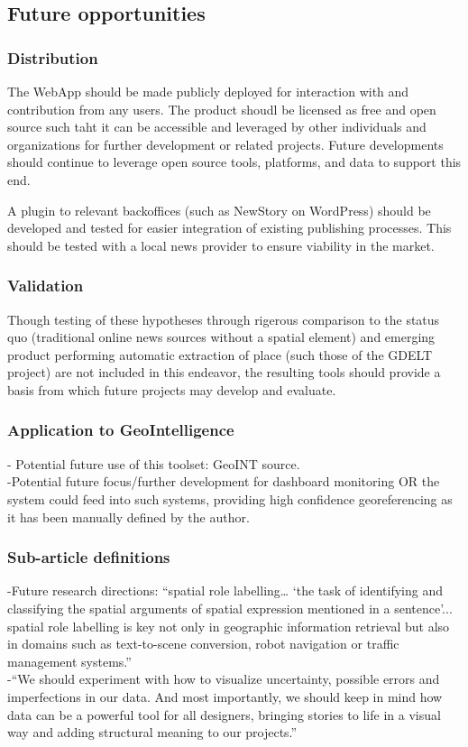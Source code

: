 \subsection{Future opportunities}
\subsubsection{Distribution}
The WebApp should be made publicly deployed for interaction with and contribution from any users. The product shoudl be licensed as free and open source such taht it can be accessible and leveraged by other individuals and organizations for further development or related projects. Future developments should continue to leverage open source tools, platforms, and data to support this end.

A plugin to relevant backoffices (such as {\color{red}NewStory} on WordPress) should be developed and tested for easier integration of existing publishing processes. This should be tested with a local news provider to ensure viability in the market.

\subsubsection{Validation}
Though testing of these hypotheses through rigerous comparison to the status quo (traditional online news sources without a spatial element) and emerging product performing automatic extraction of place (such those of the GDELT project) are not included in this endeavor, the resulting tools should provide a basis from which future projects may develop and evaluate.

\subsubsection{Application to GeoIntelligence}
-{\color{purple} Potential future use of this toolset: GeoINT source.\cite{Datta2018}}\\
-{\color{purple}Potential future focus/further development for dashboard monitoring OR the system could feed into such systems, providing high confidence georeferencing as it has been manually defined by the author.\cite{Teitler2008}}\\

\subsubsection{Sub-article definitions}
-{\color{orange}Future research directions: “spatial role labelling… ‘the task of identifying and classifying the spatial arguments of spatial expression mentioned in a sentence’... spatial role labelling is key not only in geographic information retrieval but also in domains such as text-to-scene conversion, robot navigation or traffic management systems.”\cite{Karimzadeh2019}}\\
-{\color{orange}“We should experiment with how to visualize uncertainty, possible errors and imperfections in our data. And most importantly, we should keep in mind how data can be a powerful tool for all designers, bringing stories to life in a visual way and adding structural meaning to our projects.”\cite{Lupi2017}}\\

